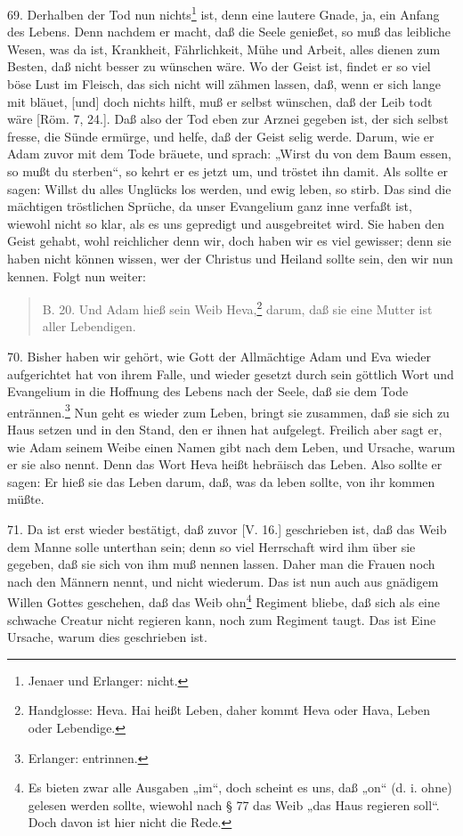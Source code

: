 69. Derhalben der Tod nun nichts\footnote{Jenaer und Erlanger: nicht.} ist, denn eine lautere Gnade, ja, ein Anfang des Lebens. Denn nachdem er macht, daß die Seele genießet, so muß das leibliche Wesen, was da ist, Krankheit, Fährlichkeit, Mühe und Arbeit, alles dienen zum Besten, daß nicht besser zu wünschen wäre. Wo der Geist ist, findet er so viel böse Lust im Fleisch, das sich nicht will zähmen lassen, daß, wenn er sich lange mit bläuet, [und] doch nichts hilft, muß er selbst wünschen, daß der Leib todt wäre [Röm. 7, 24.]. Daß also der Tod eben zur Arznei gegeben ist, der sich selbst fresse, die Sünde ermürge, und helfe, daß der Geist selig werde. Darum, wie er Adam zuvor mit dem Tode bräuete, und sprach: „Wirst du von dem Baum essen, so mußt du sterben“, so kehrt er es jetzt um, und tröstet ihn damit. Als sollte er sagen: Willst du alles Unglücks los werden, und ewig leben, so stirb. Das sind die mächtigen tröstlichen Sprüche, da unser Evangelium ganz inne verfaßt ist, wiewohl nicht so klar, als es uns gepredigt und ausgebreitet wird. Sie haben den Geist gehabt, wohl reichlicher denn wir, doch haben wir es viel gewisser; denn sie haben nicht können wissen, wer der Christus und Heiland sollte sein, den wir nun kennen. Folgt nun weiter:

\begin{quote}
B. 20. Und Adam hieß sein Weib Heva,\footnote{Handglosse: Heva. Hai heißt Leben, daher kommt Heva oder Hava, Leben oder Lebendige.} darum, daß sie eine Mutter ist aller Lebendigen.
\end{quote}

70. Bisher haben wir gehört, wie Gott der Allmächtige Adam und Eva wieder aufgerichtet hat von ihrem Falle, und wieder gesetzt durch sein göttlich Wort und Evangelium in die Hoffnung des Lebens nach der Seele, daß sie dem Tode entrännen.\footnote{Erlanger: entrinnen.} Nun geht es wieder zum
Leben, bringt sie zusammen, daß sie sich zu Haus setzen und in den Stand, den er ihnen hat aufgelegt. Freilich aber sagt er, wie Adam seinem Weibe einen Namen gibt nach dem Leben, und Ursache, warum er sie also nennt. Denn das Wort Heva heißt hebräisch das Leben. Also sollte er sagen: Er hieß sie das Leben darum, daß, was da leben sollte, von ihr kommen müßte.

71. Da ist erst wieder bestätigt, daß zuvor [V. 16.] geschrieben ist, daß das Weib dem Manne solle unterthan sein; denn so viel Herrschaft wird ihm über sie gegeben, daß sie sich von ihm muß nennen lassen. Daher man die Frauen noch nach den Männern nennt, und nicht wiederum. Das ist nun auch aus gnädigem Willen Gottes geschehen, daß das Weib ohn\footnote{Es bieten zwar alle Ausgaben „im“, doch scheint es uns, daß „on“ (d. i. ohne) gelesen werden sollte, wiewohl nach § 77 das Weib „das Haus regieren soll“. Doch davon ist hier nicht die Rede.} Regiment bliebe, daß sich als eine schwache Creatur nicht regieren kann, noch zum Regiment taugt. Das ist Eine Ursache, warum dies geschrieben ist.

